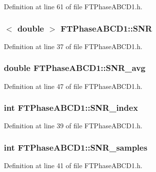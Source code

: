Definition at line 61 of file FTPhaseABCD1.h.

\hypertarget{classFTPhaseABCD1_a52ef3a131cb9f9122dc5c620a18d7a35}{
\subsubsection[{SNR}]{$<$ double $>$ {\bf FTPhaseABCD1::SNR}}}
\label{classFTPhaseABCD1_a52ef3a131cb9f9122dc5c620a18d7a35}


Definition at line 37 of file FTPhaseABCD1.h.

\hypertarget{classFTPhaseABCD1_a5d45c852200065adf91b279b84c76e66}{
\subsubsection[{SNR\_\-avg}]{\setlength{\rightskip}{0pt plus 5cm}double {\bf FTPhaseABCD1::SNR\_\-avg}}}
\label{classFTPhaseABCD1_a5d45c852200065adf91b279b84c76e66}


Definition at line 47 of file FTPhaseABCD1.h.

\hypertarget{classFTPhaseABCD1_add40ff7b5cc72bbda9b9e2963c27971b}{
\subsubsection[{SNR\_\-index}]{\setlength{\rightskip}{0pt plus 5cm}int {\bf FTPhaseABCD1::SNR\_\-index}}}
\label{classFTPhaseABCD1_add40ff7b5cc72bbda9b9e2963c27971b}


Definition at line 39 of file FTPhaseABCD1.h.

\hypertarget{classFTPhaseABCD1_ac2ec173a910e5a283e8df8caf9d995a6}{
\subsubsection[{SNR\_\-samples}]{\setlength{\rightskip}{0pt plus 5cm}int {\bf FTPhaseABCD1::SNR\_\-samples}}}
\label{classFTPhaseABCD1_ac2ec173a910e5a283e8df8caf9d995a6}


Definition at line 41 of file FTPhaseABCD1.h.

